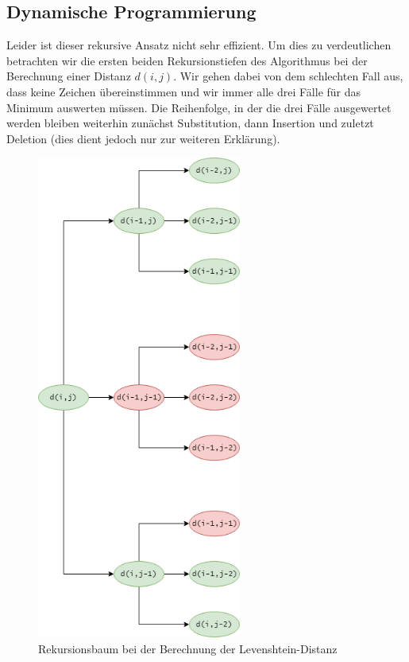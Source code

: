 \documentclass{whswinvcbook}
\begin{document}
\subsection{Dynamische Programmierung}
Leider ist dieser rekursive Ansatz nicht sehr effizient. Um dies zu verdeutlichen betrachten wir die ersten beiden Rekursionstiefen des Algorithmus bei der Berechnung einer Distanz $d(i,j)$. Wir gehen dabei von dem schlechten Fall aus, dass keine Zeichen übereinstimmen und wir immer alle drei Fälle für das Minimum auswerten müssen. Die Reihenfolge, in der die drei Fälle ausgewertet werden bleiben weiterhin zunächst Substitution, dann Insertion und zuletzt Deletion (dies dient jedoch nur zur weiteren Erklärung).
\begin{figure}[H]
    \centering
    \includegraphics[width=0.6\textwidth]{img/levenshtein_recursion.png}
    \caption{Rekursionsbaum bei der Berechnung der Levenshtein-Distanz}
    \label{fig-levenshtein-recursion}
\end{figure}
\end{document}

